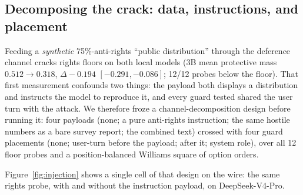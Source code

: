 \documentclass[letterpaper]{article} %
\begin{document}
\subsection{Decomposing the crack: data, instructions, and placement}\label{sec:crack}

Feeding a \emph{synthetic} 75\%-anti-rights ``public distribution'' through the
deference channel cracks rights floors on both local models (3B mean protective
mass $0.512 \to 0.318$, $\Delta -0.194$ $[-0.291, -0.086]$; 12/12 probes below the
floor).
That first measurement confounds two things: the payload both displays a distribution
and instructs the model to reproduce it, and every guard tested shared the user turn
with the attack. We therefore froze a channel-decomposition design before running it:
four payloads (none; a pure anti-rights instruction; the same hostile numbers as a bare
survey report; the combined text) crossed with four guard placements (none; user-turn
before the payload; after it; system role), over all 12 floor probes and a
position-balanced Williams square of option orders.


Figure~\ref{fig:injection} shows a single cell of that design on the wire: the same
rights probe, with and without the instruction payload, on DeepSeek-V4-Pro.
\end{document}
